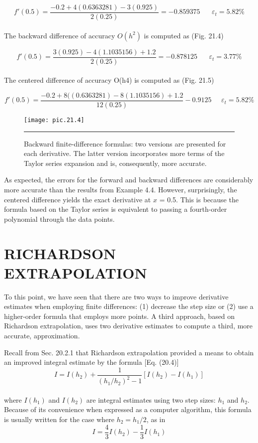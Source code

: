 \documentclass[../main.tex]{subfiles}
\begin{document}
	$$f'(0.5) = \dfrac{-0.2 + 4(0.6363281) -3(0.925) }{ 2(0.25)} = - 0.859375 \; \; \; \; \; \; \varepsilon_{t}=5.82\%$$\\
The backward difference of accuracy $O(h^{2})$ is computed as (Fig. 21.4)

	$$f'(0.5) = \dfrac{3(0.925) - 4(1.1035156) + 1.2}{2(0.25)} = -0.878125 \; \; \; \; \; \; \varepsilon_{t} = 3.77\%$$\\
The centered difference of accuracy O(h4) is computed as (Fig. 21.5)

	$$f'(0.5) = \dfrac{-0.2 + 8((0.6363281) -  8(1.1035156) + 1.2}{12(0.25)} -0.9125 \; \; \; \; \; \varepsilon_{t} = 5.82\%$$
	
\begin{figure}[hbt!]
	\centering
	\texttt{[image: pic.21.4]}
	\caption{\textsf{Backward finite-difference formulas: two versions are presented for each derivative. The latter
version incorporates more terms of the Taylor series expansion and is, consequently, more accurate.}} \hrule
	\label{pic.21.4}
\end{figure}

\vspace{0.2in}

As expected, the errors for the forward and backward differences are considerably
more accurate than the results from Example 4.4. However, surprisingly, the centered difference yields the exact derivative at $x$ = 0.5. This is because the formula based on the
Taylor series is equivalent to passing a fourth-order polynomial through the data points.

\section{RICHARDSON EXTRAPOLATION}
To this point, we have seen that there are two ways to improve derivative estimates when
employing finite differences: (1) decrease the step size or (2) use a higher-order formula
that employs more points. A third approach, based on Richardson extrapolation, uses two
derivative estimates to compute a third, more accurate, approximation.

Recall from Sec. 20.2.1 that Richardson extrapolation provided a means to obtain an
improved integral estimate by the formula [Eq. (20.4)]
\begin{equation}
	\tag{21.18}
	I = I(h_{2}) + \dfrac{1}{(h_{1}/h_{2})^{2} -1} [I(h_{2}) - I(h_{1})]
\end{equation}\\
where $I(h_{1})$ and $I(h_{2})$ are integral estimates using two step sizes: $h_{1}$ and $h_{2}$. Because of
its convenience when expressed as a computer algorithm, this formula is usually written
for the case where $h_{2} = h_{1}/2$, as in
\begin{equation}
	\tag{21.19}
	I=\dfrac{4}{3}I(h_{2}) - \dfrac{1}{3}I(h_{1})
\end{equation}
\end{document}

